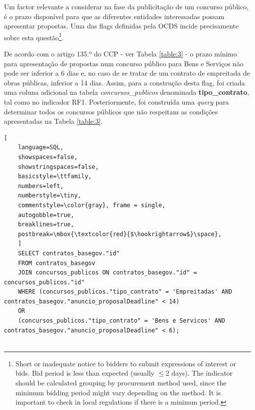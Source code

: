 Um factor relevante a considerar na fase da publicitação de um concurso público, é o prazo disponível para que as diferentes entidades interessadas possam apresentar propostas. Uma das flags definidas pela OCDS incide precisamente sobre esta questão\footnote{Short or inadequate notice to bidders to submit expressions of interest or bids. Bid period is less than expected (usually $\leq$2 days). The indicator should be calculated grouping by procurement method used, since the minimum bidding period might vary depending on the method.  It is important to check in local regulations if there is a minimun period.}.


De acordo com o artigo 135.º do CCP - ver Tabela \ref{table:3} - o prazo mínimo para apresentação de propostas num concurso público para Bens e Serviços não pode ser inferior a 6 dias e, no caso de se tratar de um  contrato de empreitada de obras públicas, inferior a 14 dias. Assim, para a construção desta flag, foi criada uma coluna adicional na tabela \textit{concursos\_publicos} denominada \textbf{tipo\_contrato}, tal como no indicador RF1. Posteriormente, foi construída uma \textit{query} para determinar todos os concursos públicos que não respeitam as condições apresentadas na Tabela \ref{table:3}. \\


\begin{lstlisting}[
	language=SQL,
	showspaces=false,
	showstringspaces=false,
	basicstyle=\ttfamily,
	numbers=left,
	numberstyle=\tiny,
	commentstyle=\color{gray}, frame = single,
	autogobble=true,
	breaklines=true,
	postbreak=\mbox{\textcolor{red}{$\hookrightarrow$}\space},
	]
	SELECT contratos_basegov."id" 
	FROM contratos_basegov
	JOIN concursos_publicos ON contratos_basegov."id" = concursos_publicos."id"
	WHERE (concursos_publicos."tipo_contrato" = 'Empreitadas' AND contratos_basegov."anuncio_proposalDeadline" < 14) 
	OR
	(concursos_publicos."tipo_contrato" = 'Bens e Servicos' AND contratos_basegov."anuncio_proposalDeadline" < 6);
	
\end{lstlisting}



